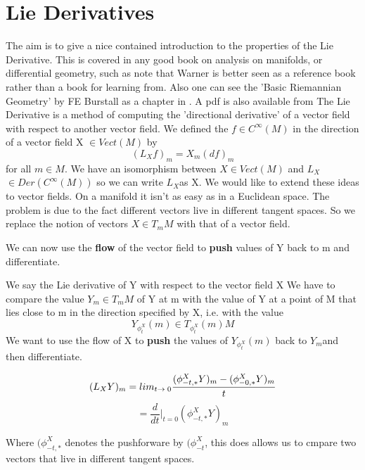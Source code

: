 \section{Lie Derivatives}
The aim is to give a nice contained introduction to the properties of the Lie Derivative. This is covered 
in any good book on analysis on manifolds, or differential geometry, such as \cite{jost2011riemannian,differentialmanifolds}
note that Warner\cite{differentialmanifolds} is better seen as a reference book rather than a book for learning from. 
Also one can see the 'Basic Riemannian Geometry' by FE Burstall as a chapter in \cite{davies1999spectral}.
A pdf is also available from \cite{basicriemanniangeometry}
The Lie Derivative is a method of computing the 'directional derivative' of a vector field with 
respect to another vector field. We defined the  $f \in C^{\infty}(M)$ in the
direction of a vector field X $\in Vect(M)$ by
\begin{equation}
 (L_X f)_m = X_m(df)_m
\end{equation}
for all $m \in M$. We have an isomorphism between $X \in Vect(M)$ and $L_X$ $\in Der(C^{\infty}(M))$ so we
can write $L_X$as X.
   We would like to extend these ideas to vector fields. On a manifold it isn't as easy as in a Euclidean space. The
problem is due to the fact different vectors live in different tangent spaces. So we replace the notion of vectors $X \in T_m M$
with that of a vector field. 
\begin{idea}
 We can now use the \textbf{flow} of the vector field to \textbf{push} values of Y back to m and differentiate.
\end{idea}
We say the Lie derivative of Y with respect to the vector field X
We have to compare the value $Y_m \in T_m M$ of Y at m with the value of Y at a point of M that lies close to m in
the direction specified by X, i.e. with the value 
\begin{equation*}
 Y_{\phi^X_t}(m) \in T_{\phi^{X}_t}(m)M
\end{equation*}
We want to use the flow of X to \textbf{push} the values of $Y_{\phi^X_t}(m)$ back to $Y_m$and then differentiate.
\begin{dfn}
 \begin{equation*}
  (L_X Y)_m = lim_{t\rightarrow \;0} \frac{(\phi^{X}_{-t,*}Y)_m-(\phi^{X}_{-0,*}Y)_m}{t}
 \end{equation*}
\begin{equation*}
 = \frac{d}{dt}|_{t=0} (\phi^{X}_{-t,*}Y)_m
\end{equation*}

\end{dfn}
Where $(\phi^{X}_{-t,*}$ denotes the pushforware by $(\phi^{X}_{-t}$, this does allows us to cmpare two vectors that live in
different tangent spaces. 